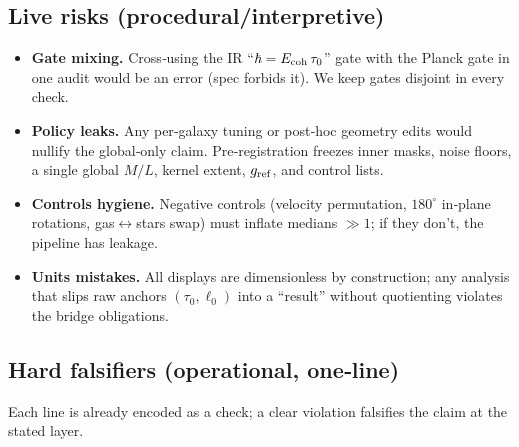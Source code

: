 \documentclass[11pt]{article}
\begin{document}
\subsection{Live risks (procedural/interpretive)}
\begin{itemize}
  \item \textbf{Gate mixing.} Cross‑using the IR “$\hbar=E_{\rm coh}\,\tau_0$” gate with the Planck gate in one audit would be an error (spec forbids it). We keep gates disjoint in every check.
  \item \textbf{Policy leaks.} Any per‑galaxy tuning or post‑hoc geometry edits would nullify the global‑only claim. Pre‑registration freezes inner masks, noise floors, a single global $M/L$, kernel extent, $g_{\rm ref}$, and control lists.
  \item \textbf{Controls hygiene.} Negative controls (velocity permutation, $180^\circ$ in‑plane rotations, gas$\leftrightarrow$stars swap) must inflate medians $\gg 1$; if they don’t, the pipeline has leakage.
  \item \textbf{Units mistakes.} All displays are dimensionless by construction; any analysis that slips raw anchors $(\tau_0,\ell_0)$ into a “result” without quotienting violates the bridge obligations.
\end{itemize}

\subsection{Hard falsifiers (operational, one‑line)}
Each line is already encoded as a check; a clear violation falsifies the claim at the stated layer.
\end{document}
